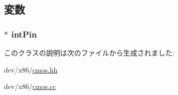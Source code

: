 \subsection{変数}
\hypertarget{classX86ISA_1_1Cmos_1_1X86RTC_abc04d372f6b8e69a72f4c25db91ede99}{
\subsubsection[{intPin}]{$\ast$ {\bf intPin}}}
\label{classX86ISA_1_1Cmos_1_1X86RTC_abc04d372f6b8e69a72f4c25db91ede99}


このクラスの説明は次のファイルから生成されました:\begin{DoxyCompactItemize}
\item 
dev/x86/\hyperlink{cmos_8hh}{cmos.hh}\item 
dev/x86/\hyperlink{cmos_8cc}{cmos.cc}\end{DoxyCompactItemize}
